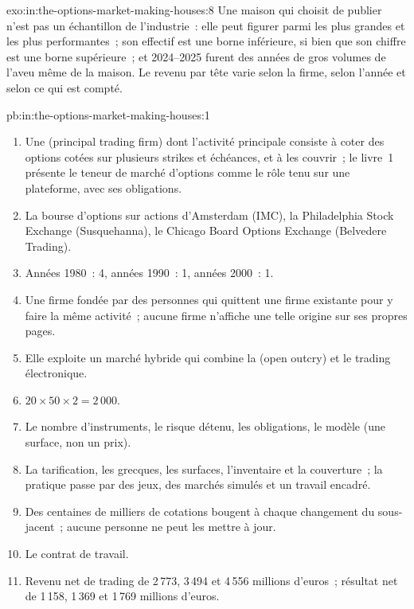 \begin{solution}{exo:in:the-options-market-making-houses:8}
Une maison qui choisit de publier n'est pas un échantillon de l'industrie~: elle peut figurer parmi les plus grandes et les plus performantes~;
son effectif est une borne inférieure, si bien que son chiffre est une borne supérieure~; et 2024--2025 furent des années de gros volumes
de l'aveu même de la maison. Le revenu par tête varie selon la firme, selon l'année et selon ce qui est compté.
\end{solution}

\begin{solution}{pb:in:the-options-market-making-houses:1}
\begin{enumerate}
\item Une  (principal trading firm) dont l'activité principale consiste à coter des options cotées sur plusieurs strikes et échéances, et
à les couvrir~; le livre~1 présente le teneur de marché d'options comme le rôle tenu sur une plateforme, avec ses obligations.
\item La bourse d'options sur actions d'Amsterdam (IMC), la Philadelphia Stock Exchange (Susquehanna), le Chicago Board Options Exchange
(Belvedere Trading).
\item Années 1980~: 4, années 1990~: 1, années 2000~: 1.
\item Une firme fondée par des personnes qui quittent une firme existante pour y faire la même activité~; aucune firme n'affiche une telle origine sur
ses propres pages.
\item Elle exploite un marché hybride qui combine la  (open outcry) et le trading électronique.
\item $20\times50\times2=2\,000$.
\item Le nombre d'instruments, le risque détenu, les obligations, le modèle (une surface, non un prix).
\item La tarification, les grecques, les surfaces, l'inventaire et la couverture~; la pratique passe par des jeux, des marchés simulés et
un travail encadré.
\item Des centaines de milliers de cotations bougent à chaque changement du sous-jacent~; aucune personne ne peut les mettre à jour.
\item Le contrat de travail.
\item Revenu net de trading de 2\,773, 3\,494 et 4\,556 millions d'euros~; résultat net de 1\,158, 1\,369 et 1\,769 millions d'euros.

\end{enumerate}
\end{solution}

